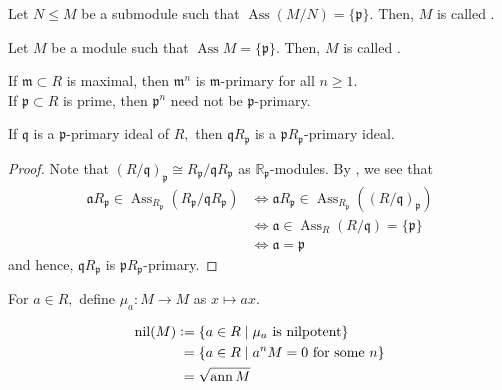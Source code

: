 \documentclass[12pt]{article}	%
\DeclareMathOperator{\Ass}{Ass}
\DeclareMathOperator{\ann}{ann}
\DeclareMathOperator{\nil}{nil}
\begin{document}
\begin{defn}%
	Let $N \le M$ be a submodule such that $\Ass(M/N) = \{\mathfrak{p}\}.$ Then, $M$ is called .
\end{defn}
\begin{defn}%
	Let $M$ be a module such that $\Ass M = \{\mathfrak{p}\}.$ Then, $M$ is called .
\end{defn}

\begin{ex}
	If $\mathfrak{m} \subset R$ is maximal, then $\mathfrak{m}^n$ is $\mathfrak{m}$-primary for all $n \ge 1.$\\
	If $\mathfrak{p} \subset R$ is prime, then $\mathfrak{p}^n$ need not be $\mathfrak{p}$-primary.
\end{ex}

\begin{prop}
	If $\mathfrak{q}$ is a $\mathfrak{p}$-primary ideal of $R,$ then $\mathfrak{q}R_{\mathfrak{p}}$ is a $\mathfrak{p}R_{\mathfrak{p}}$-primary ideal.
\end{prop}
\begin{proof} 
	Note that $(R/\mathfrak{q})_{\mathfrak{p}} \cong R_{\mathfrak{p}}/\mathfrak{q}R_{\mathfrak{p}}$ as $\mathbb{R}_{\mathfrak{p}}$-modules. By , we see that
	\begin{align*} 
		\mathfrak{a}R_{\mathfrak{p}} \in \Ass_{R_{\mathfrak{p}}}(R_{\mathfrak{p}}/\mathfrak{q}R_{\mathfrak{p}}) &\iff \mathfrak{a}R_{\mathfrak{p}} \in \Ass_{R_{\mathfrak{p}}}\left((R/\mathfrak{q})_{\mathfrak{p}}\right)\\
		&\iff \mathfrak{a} \in \Ass_R(R/\mathfrak{q}) = \{\mathfrak{p}\}\\
		&\iff \mathfrak{a} = \mathfrak{p}
	\end{align*}
	and hence, $\mathfrak{q}R_{\mathfrak{p}}$ is $\mathfrak{p}R_{\mathfrak{p}}$-primary.
\end{proof}

\begin{defn}%
	For $a \in R,$ define $\mu_a : M \to M$ as $x \mapsto ax.$
\end{defn}

\begin{defn}%
	\begin{align*} 
		\nil(M) \vcentcolon=&\; \{a \in R \mid \mu_a \text{ is nilpotent}\}\\
		=&\; \{a \in R \mid a^nM = 0 \text{ for some } n\}\\
		=&\; \sqrt{\ann M}
	\end{align*}
\end{defn}
\end{document}
